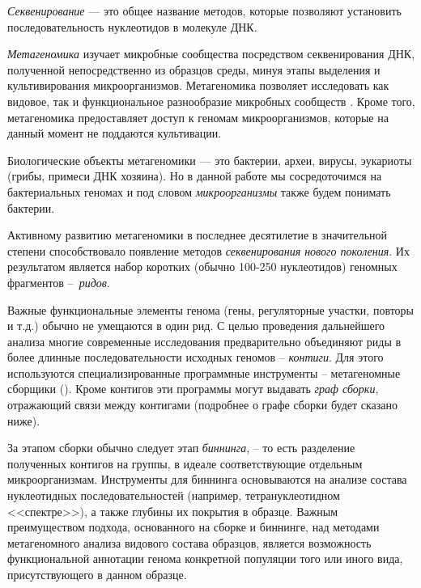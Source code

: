 \documentclass{spbau-diploma}
\begin{document}
\textit{Секвенирование} --- это общее название методов, которые позволяют установить последовательность нуклеотидов в молекуле ДНК. 

\textit{Метагеномика} изучает микробные сообщества посредством секвенирования ДНК, полученной непосредственно из образцов среды, минуя этапы выделения и культивирования микроорганизмов. Метагеномика позволяет исследовать как видовое, так и функциональное разнообразие микробных сообществ \cite{HMP1, HMP2}. 
Кроме того, метагеномика предоставляет доступ к геномам микроорганизмов, которые на данный момент не поддаются культивации.

Биологические объекты метагеномики --- это бактерии, археи, вирусы, эукариоты (грибы, примеси ДНК хозяина). Но в данной работе мы сосредоточимся на бактериальных геномах и под словом \textit{микроорганизмы} также будем понимать бактерии.

Активному развитию метагеномики в последнее десятилетие в значительной степени способствовало появление методов \textit{секвенирования нового поколения}. Их результатом является набор коротких (обычно 100-250 нуклеотидов) геномных фрагментов --~\textit{ридов}. 

Важные функциональные элементы генома (гены, регуляторные участки, повторы и т.д.) обычно не умещаются в один рид. 
С целью проведения дальнейшего анализа многие современные исследования предварительно объединяют риды в более длинные последовательности исходных геномов -- \textit{контиги}. 
Для этого используются специализированные программные инструменты -- метагеномные сборщики (\cite{IDBA-UD, MEGAHIT, MetaVelvet, RayMeta, MetaSpades}). Кроме контигов эти программы могут выдавать \textit{граф сборки}, отражающий связи между контигами (подробнее о графе сборки будет сказано ниже).

За этапом сборки обычно следует этап \textit{биннинга}, -- то есть разделение полученных контигов на группы, в идеале соответствующие отдельным микроорганизмам. Инструменты для биннинга \cite{CONCOCT, GroopM, MyCC, MetaBAT} основываются на анализе состава нуклеотидных последовательностей (например, тетрануклеотидном <<спектре>>), а также глубины их покрытия в образце. 
Важным преимуществом подхода, основанного на сборке и биннинге, над методами метагеномного анализа видового состава образцов, является возможность функциональной аннотации генома конкретной популяции того или иного вида, присутствующего в данном образце. %
\end{document}
